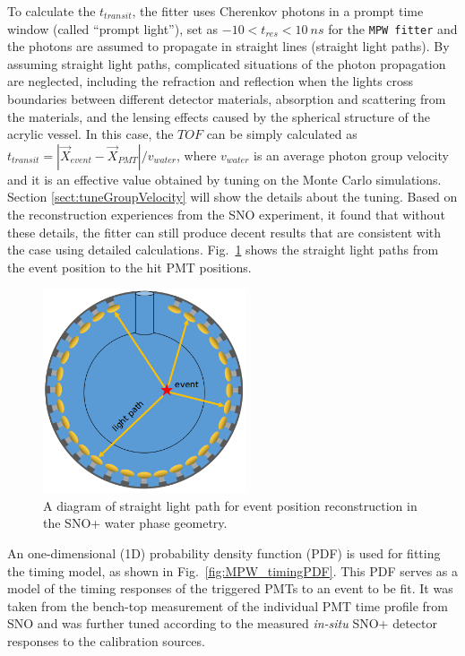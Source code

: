 To calculate the $t_{transit}$, the fitter uses Cherenkov photons in a prompt time window (called ``prompt light''), set as $-10<t_{res}<10~ns$ for the \texttt{MPW fitter} and the photons are assumed to propagate in straight lines (straight light paths). By assuming straight light paths, complicated situations of the photon propagation are neglected, including the refraction and reflection when the lights cross boundaries between different detector materials, absorption and scattering from the materials, and the lensing effects caused by the spherical structure of the acrylic vessel. In this case, the $TOF$ can be simply calculated as $t_{transit}=|\vec{X}_{event}-\vec{X}_{PMT}|/v_{water}$, where $v_{water}$ is an average photon group velocity and it is an effective value obtained by tuning on the Monte Carlo simulations. Section \ref{sect:tuneGroupVelocity} will show the details about the tuning. Based on the reconstruction experiences from the SNO experiment, it found that without these details, the fitter can still produce decent results that are consistent with the case using detailed calculations\cite{boulay2004direct,jones2011background}. Fig.~\ref{mpwdiagram_position} shows the straight light paths from the event position to the hit PMT positions.
\begin{figure}[htbp]
	\centering
   \includegraphics[width=6cm]{mpwDiagram.png}
	\caption[Straight light path calculation in the water geometry.]{A diagram of straight light path for event position reconstruction in the SNO+ water phase geometry.}
	\label{mpwdiagram_position}
\end{figure}

An one-dimensional (1D) probability density function (PDF) is used for fitting the timing model, as shown in Fig.~\ref{fig:MPW_timingPDF}. This PDF serves as a model of the timing responses of the triggered PMTs to an event to be fit. It was taken from the bench-top measurement of the individual PMT time profile from SNO\cite{jillings1996photomultiplier} and was further tuned according to the measured \emph{in-situ} SNO+ detector responses to the calibration sources\cite{anderson2021optical}.

